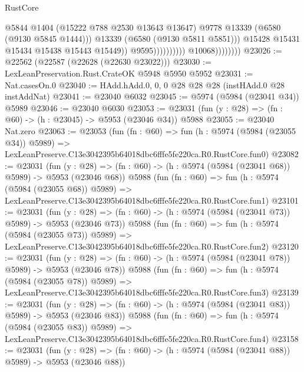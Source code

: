 \begin{lexlean}{RustCore}
\begin{coremodule}
                                                @5844
                                                @1404
                                                (@15222 @788 @2530 @13643 @13647)
                                                @9778
                                                @13339
                                                (@6580 (@9130 @5845 @1444)))
                                              @13339
                                              (@6580 (@9130 @5811 @5851)))
                                            @15428
                                            @15431
                                            @15434
                                            @15438
                                            @15443
                                            @15449))
                                        @9595))))))))))
                    @10068))))))))
@23026 := @22562 (@22587 (@22628 (@22630 @23022)))
@23030 := LexLeanPreservation.Rust.CrateOK @5948 @5950 @5952
@23031 := Nat.casesOn.{0}
@23040 := HAdd.hAdd.{0, 0, 0} @28 @28 @28 (instHAdd.{0} @28 instAddNat)
@23041 := @23040 @6032
@23045 := @5974 (@5984 (@23041 @34)) @5989
@23046 := @23040 @6030
@23053 := @23031 (fun (y : @28) => (fn : @60) -> (h : @23045) -> @5953 (@23046 @34)) @5988
@23055 := @23040 Nat.zero
@23063 := @23053
    (fun (fn : @60) =>
    fun (h : @5974 (@5984 (@23055 @34)) @5989) =>
    LexLeanPreserve.C13e3042395b64018dbc6fffe5fe220ca.R0.RustCore.fun0)
@23082 := @23031
    (fun (y : @28) => (fn : @60) -> (h : @5974 (@5984 (@23041 @68)) @5989) -> @5953 (@23046 @68))
    @5988
    (fun (fn : @60) =>
    fun (h : @5974 (@5984 (@23055 @68)) @5989) =>
    LexLeanPreserve.C13e3042395b64018dbc6fffe5fe220ca.R0.RustCore.fun1)
@23101 := @23031
    (fun (y : @28) => (fn : @60) -> (h : @5974 (@5984 (@23041 @73)) @5989) -> @5953 (@23046 @73))
    @5988
    (fun (fn : @60) =>
    fun (h : @5974 (@5984 (@23055 @73)) @5989) =>
    LexLeanPreserve.C13e3042395b64018dbc6fffe5fe220ca.R0.RustCore.fun2)
@23120 := @23031
    (fun (y : @28) => (fn : @60) -> (h : @5974 (@5984 (@23041 @78)) @5989) -> @5953 (@23046 @78))
    @5988
    (fun (fn : @60) =>
    fun (h : @5974 (@5984 (@23055 @78)) @5989) =>
    LexLeanPreserve.C13e3042395b64018dbc6fffe5fe220ca.R0.RustCore.fun3)
@23139 := @23031
    (fun (y : @28) => (fn : @60) -> (h : @5974 (@5984 (@23041 @83)) @5989) -> @5953 (@23046 @83))
    @5988
    (fun (fn : @60) =>
    fun (h : @5974 (@5984 (@23055 @83)) @5989) =>
    LexLeanPreserve.C13e3042395b64018dbc6fffe5fe220ca.R0.RustCore.fun4)
@23158 := @23031
    (fun (y : @28) => (fn : @60) -> (h : @5974 (@5984 (@23041 @88)) @5989) -> @5953 (@23046 @88))

\end{coremodule}
\end{lexlean}
